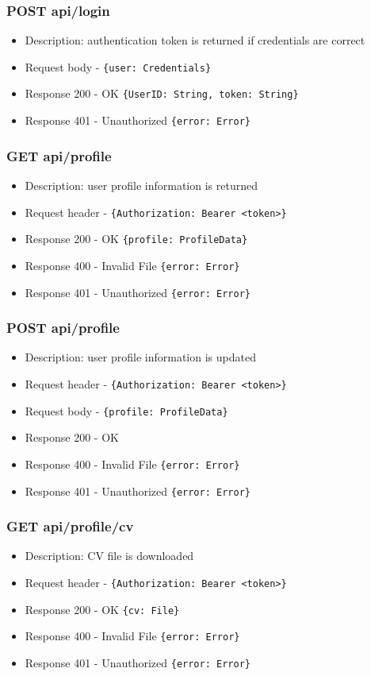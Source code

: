 \subsubsection{POST api/login}
\begin{itemize}
    \item Description: authentication token is returned if credentials are correct
    \item Request body - \verb|{user: Credentials}|
    \item Response 200 - OK \verb|{UserID: String, token: String}|
    \item Response 401 - Unauthorized \verb|{error: Error}|
\end{itemize}

\subsubsection{GET api/profile}
\begin{itemize}
    \item Description: user profile information is returned
    \item Request header - \verb|{Authorization: Bearer <token>}|
    \item Response 200 - OK \verb|{profile: ProfileData}|
    \item Response 400 - Invalid File \verb|{error: Error}|
    \item Response 401 - Unauthorized \verb|{error: Error}|
\end{itemize}

\subsubsection{POST api/profile}
\begin{itemize}
    \item Description: user profile information is updated
    \item Request header - \verb|{Authorization: Bearer <token>}|
    \item Request body - \verb|{profile: ProfileData}|
    \item Response 200 - OK
    \item Response 400 - Invalid File \verb|{error: Error}|
    \item Response 401 - Unauthorized \verb|{error: Error}|
\end{itemize}

\subsubsection{GET api/profile/cv}
\begin{itemize}
    \item Description: CV file is downloaded
    \item Request header - \verb|{Authorization: Bearer <token>}|
    \item Response 200 - OK \verb|{cv: File}|
    \item Response 400 - Invalid File \verb|{error: Error}|
    \item Response 401 - Unauthorized \verb|{error: Error}|
\end{itemize}

